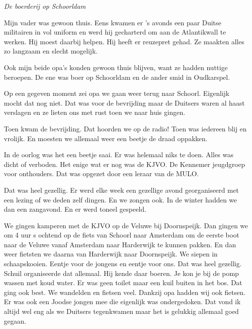 \documentclass{scrbook}
\begin{document}
\textit{De boerderij op Schoorldam }



Mijn vader was gewoon thuis. Eens kwamen er ’s avonds een paar Duitse militairen in vol uniform en werd hij gecharterd om aan de Atlantikwall te werken. Hij moest daarbij helpen. Hij heeft er reuzepret gehad. Ze maakten alles zo langzaam en slecht mogelijk. 

Ook mijn beide opa’s konden gewoon thuis blijven, want ze hadden nuttige beroepen. De ene was boer op Schoorldam en de ander smid in Oudkarspel. 

Op een gegeven moment zei opa we gaan weer terug naar Schoorl. Eigenlijk mocht dat nog niet. Dat was voor de bevrijding maar de Duitsers waren al haast verslagen en ze lieten ons met rust toen we naar huis gingen.

Toen kwam de bevrijding. Dat hoorden we op de radio! Toen was iedereen blij en vrolijk. En moesten we allemaal weer een beetje de draad oppakken. 

In de oorlog was het een beetje saai. Er was helemaal niks te doen. Alles was dicht of verboden. Het enige wat er nog was de KJVO. De Kennemer jeugdgroep voor onthouders. Dat was opgezet door een leraar van de MULO. 

Dat was heel gezellig. Er werd elke week een gezellige avond georganiseerd met een lezing of we deden zelf dingen. En we zongen ook. In de winter hadden we dan een zangavond. En er werd toneel gespeeld.

We gingen kamperen met de KJVO op de Veluwe bij Doornspeijk. Dan gingen we om 4 uur s ochtend op de fiets van Schoorl naar Amsterdam om de eerste boot naar de Veluwe vanaf Amsterdam naar Harderwijk te kunnen pakken. En dan weer fietsten we daarna van Harderwijk naar Doornspeijk. We siepen in schaapskooien. Eentje voor de jongens en eentje voor ons. Dat was heel gezellig. Schuil organiseerde dat allemaal. Hij kende daar boeren. Je kon je bij de pomp wassen met koud water. Er was geen toilet maar een kuil buiten in het bos. Dat ging ook best. We wandelden en fietsen veel. Dankzij opa hadden wij ook fietsen. Er was ook een Joodse jongen mee die eigenlijk was ondergedoken. Dat vond ik altijd wel eng als we Duitsers tegenkwamen maar het is gelukkig allemaal goed gegaan. 
\end{document}
